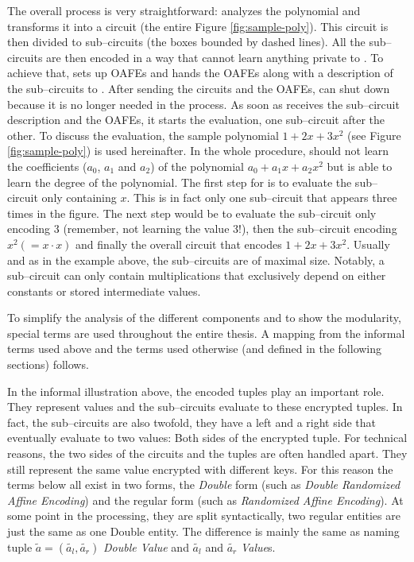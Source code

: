 The overall process is very straightforward: \JWpOne{} analyzes the polynomial
and transforms it into a circuit (the entire Figure \ref{fig:sample-poly}). This
circuit is then divided to sub--circuits (the boxes bounded by dashed lines).
All the sub--circuits are then encoded in a way that \JWpTwo{} cannot learn
anything private to \JWpOne{}. To achieve that, \JWpOne{} sets up OAFEs and
hands the OAFEs along with a description of the sub--circuits to \JWpTwo{}.
After sending the circuits and the OAFEs, \JWpOne{} can shut down because it is
no longer needed in the process. As soon as \JWpTwo{} receives the sub--circuit
description and the OAFEs, it starts the evaluation, one sub--circuit after the
other. To discuss the evaluation, the sample polynomial $1 + 2x + 3x^2$ (see
Figure \ref{fig:sample-poly}) is used hereinafter. In the whole procedure,
\JWpTwo{} should not learn the coefficients ($a_0$, $a_1$ and $a_2$) of the
polynomial $a_0 + a_1x + a_2x^2$ but is able to learn the degree of the
polynomial. The first step for \JWpTwo{} is to evaluate the sub--circuit only
containing $x$.  This is in fact only one sub--circuit that appears three times
in the figure.  The next step would be to evaluate the sub--circuit only
encoding $3$ (remember, not learning the value $3$!), then the sub--circuit
encoding $x^2 (= x \cdot x)$ and finally the overall circuit that encodes $1 +
2x + 3x^2$.  Usually and as in the example above, the sub--circuits are of
maximal size. Notably, a sub--circuit can only contain multiplications that
exclusively depend on either constants or stored intermediate values.

To simplify the analysis of the different components and to show the modularity,
special terms are used throughout the entire thesis. A mapping from the informal
terms used above and the terms used otherwise (and defined in the following
sections) follows.

In the informal illustration above, the encoded tuples play an important role.
They represent values and the sub--circuits evaluate to these encrypted tuples.
In fact, the sub--circuits are also twofold, they have a left and a right side
that eventually evaluate to two values: Both sides of the encrypted tuple. For
technical reasons, the two sides of the circuits and the tuples are often
handled apart. They still represent the same value encrypted with different
keys. For this reason the terms below all exist in two forms, the \emph{Double}
form (such as \emph{Double Randomized Affine Encoding}) and the regular form
(such as \emph{Randomized Affine Encoding}). At some point in the processing,
they are split syntactically, two regular entities are just the same as one
Double entity. The difference is mainly the same as naming tuple $\widetilde{a}
= (\widetilde{a_l}, \widetilde{a_r})$ \emph{Double Value} and $\widetilde{a_l}$
and $\widetilde{a_r}$ \emph{Value}s.

